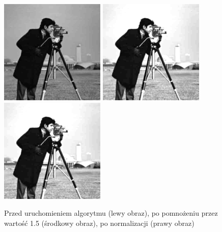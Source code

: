 \documentclass[a4paper,12pt]{book}
\begin{document}
\begin{figure}[H]
	\caption{Przed uruchomieniem algorytmu (lewy obraz), po pomnożeniu przez wartość 1.5 (środkowy obraz), po normalizacji (prawy obraz)}
	\includegraphics[width=5cm, height=5cm]{man-unmodified.jpg}
	\includegraphics[width=5cm, height=5cm]{2-2/multiply-gray-const-photoman-15.png}
	\includegraphics[width=5cm, height=5cm]{2-2/multiply-gray-const-photoman-15-norm.png}
\end{figure}
\end{document}
